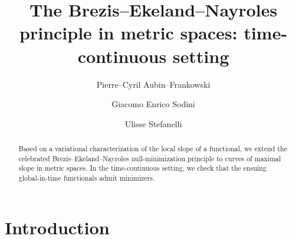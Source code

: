 \documentclass[reqno]{amsart}
\begin{document}
\title[Brezis--Ekeland--Nayroles principle in metric spaces]{The Brezis--Ekeland--Nayroles principle in metric spaces:
time-continuous setting}
 
\author[P.-C. Aubin--Frankowski]{Pierre--Cyril Aubin--Frankowski}
\address[P.-C. Aubin--Frankowski]{CERMICS, CNRS, ENPC, Institut Polytechnique de Paris, 6 and 8 avenue Blaise-Pascal, Cit\'e Descartes,
Champs-sur-Marne, F-77455, Marne-la-Vall\'ee cedex 2, France.}

\author[G.~E. Sodini]{Giacomo Enrico Sodini}
\address[G.~E. Sodini]{Institute of Analysis and Scientific Computing, TU Wien,
  Wiedner Hauptstra\ss e 8-10, A-1040, Vienna, Austria.}

\author[U. Stefanelli]{Ulisse Stefanelli}
\address[U. Stefanelli]{Faculty of Mathematics, University of Vienna, Oskar-Morgenstern-Platz 1, A-1090 Vienna, Austria.}





 \begin{abstract}
  Based on a variational characterization of the local
  slope of a functional, we extend the celebrated
  Brezis--Ekeland--Nayroles null-minimization principle to curves of
  maximal slope  in metric
  spaces. In the time-continuous setting, we check that the ensuing
  global-in-time functionals admit minimizers.
 \end{abstract}

 



 \maketitle

 \section{Introduction}

 \setcounter{equation}{0}
\end{document}
